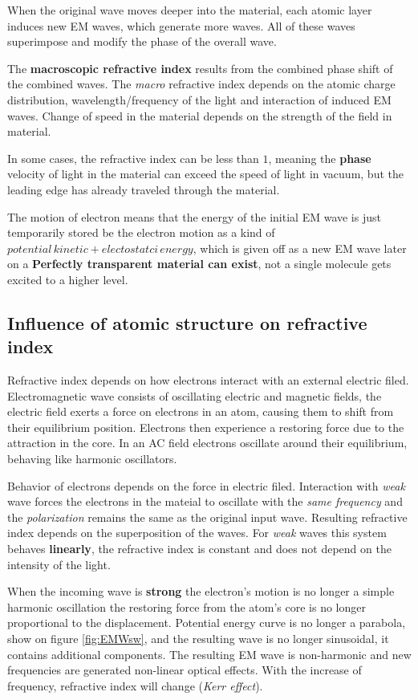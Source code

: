 When the original wave moves deeper into the material, each atomic layer induces new EM waves, 
which generate more waves. All of these waves superimpose and modify the phase of the 
overall wave. 

The \textbf{macroscopic refractive index} results from the combined phase shift 
of the combined waves. 
The \textit{macro} refractive index depends on the atomic charge distribution, wavelength/frequency of the light and interaction 
of induced EM waves. Change of speed in the material depends on the strength of the field in material. 

In some cases, the refractive index can be less than $1$, meaning the \textbf{phase} velocity of light in the material 
can exceed the speed of light in vacuum, but the leading edge has already traveled through the material.


The motion of electron means that the energy of the initial EM wave 
is just temporarily stored  be the electron motion as a kind of $potential \, kinetic + electostatci \, energy$,
which is given off as a new EM wave later on \pd a \textbf{Perfectly transparent material can exist}, not a 
single molecule gets excited to a higher level.

\subsection{Influence of atomic structure on refractive index}

Refractive index depends on how electrons interact with an external electric filed. 
Electromagnetic wave consists of oscillating electric and magnetic fields, 
the electric field exerts a force on electrons in an atom, causing them to shift from their equilibrium position.
Electrons then experience a restoring force due to the attraction in the core. In an AC field
electrons oscillate around their equilibrium, behaving like harmonic oscillators.

Behavior of electrons depends on the force in electric filed. Interaction with \textit{weak} wave forces the electrons in the mateial 
to oscillate  with the \textit{same frequency} and the \textit{polarization} remains the same as the original input wave. 
Resulting refractive index depends on the superposition of the waves. For \textit{weak} waves this system behaves \textbf{linearly}, the refractive index 
is constant and does not depend on the intensity of the light. 


When the incoming wave is \textbf{strong} the electron's motion is no longer a simple 
harmonic oscillation \pd the restoring force from the atom's core is no longer proportional 
to the displacement. Potential energy curve is no longer a parabola, show on figure \ref{fig:EMWsw}, and the
resulting wave is no longer sinusoidal, it contains additional components. The resulting 
EM wave is non-harmonic and new frequencies are generated \pd non-linear optical effects. 
With the increase of frequency, refractive index will change (\textit{Kerr effect}).


